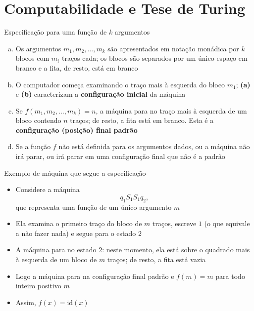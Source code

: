 \section{Computabilidade e Tese de Turing}

\begin{frame}[fragile]{Especificação para uma função de $k$ argumentos}

    \begin{enumerate}[(a)]
        \item Os argumentos $m_1, m_2, \ldots, m_k$ são apresentados em notação monádica por
            $k$ blocos com $m_i$ traços cada; os blocos são separados por um único espaço em branco
            e a fita, de resto, está em branco
        \item O computador começa examinando o traço mais à esquerda do bloco $m_1$; \textbf{(a)}
            e \textbf{(b)} caracterizam a \textbf{configuração inicial} da máquina
        \item Se $f(m_1, m_2, \ldots, m_k) = n$, a máquina para no traço mais à esquerda de um
            bloco contendo $n$ traços; de resto, a fita está em branco. Esta é a 
            \textbf{configuração (posição) final padrão}
        \item Se a função $f$ não está definida para os argumentos dados, ou a máquina não irá
            parar, ou irá parar em uma configuração final que não é a padrão
    \end{enumerate}

\end{frame}

\begin{frame}[fragile]{Exemplo de máquina que segue a especificação}

    \begin{itemize}
        \item Considere a máquina
        \[
            q_1S_1S_1q_2,
        \]
        que representa uma função de um único argumento $m$

        \item Ela examina o primeiro traço do bloco de $m$ traços, escreve $1$ (o que equivale
            a não fazer nada) e segue para o estado $2$

        \item A máquina para no estado $2$: neste momento, ela está sobre o quadrado mais à
            esquerda de um bloco de $m$ traços; de resto, a fita está vazia

        \item Logo a máquina para na configuração final padrão e $f(m) = m$ para todo inteiro
            positivo $m$

        \item Assim, $f(x) = \mathrm{id}(x)$
    \end{itemize}

\end{frame}

